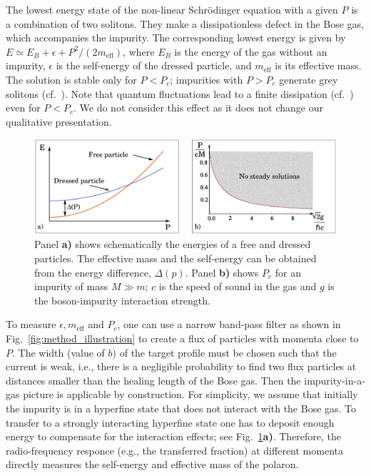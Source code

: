 \documentclass[twocolumn,amsmath,amssymb,showpacs,pra,superscriptaddress,aps]{revtex4-1}
\begin{document}
The lowest energy state of the non-linear Schr{\"o}dinger equation with a given $P$ is a combination of two solitons. They make a dissipationless defect in the Bose gas, which accompanies the impurity. The corresponding lowest energy is given by $E\simeq E_B+\epsilon+P^2/(2m_{\mathrm{eff}})$, where $E_B$ is the energy of the gas without an impurity, $\epsilon$ is the self-energy of the dressed particle, and $m_{\mathrm{eff}}$ is its effective mass. The solution is stable only for $P<P_c$; impurities with $P>P_c$ generate grey solitons (cf.~\cite{hakim1997}). Note that quantum fluctuations lead to a finite dissipation (cf.~\cite{astrakharchik2004,sykes2009,Cherny2012}) even for $P<P_c$. We do not consider this effect as it does not change our qualitative presentation.


\begin{figure}
\centerline{\includegraphics[scale=0.3]{figure3.pdf}}
\caption{Panel {\bf a)} shows schematically the energies of a free and dressed particles. 
The effective mass and the self-energy 
can be obtained from the energy difference, $\Delta(p)$.
Panel {\bf b)} shows $P_c$ for an impurity of mass $M\gg m$; 
$c$ is the speed of sound in the gas and $g$ is the boson-impurity interaction strength.
  }
\label{fig:Figure3}
\end{figure}



To measure $\epsilon, m_{\mathrm{eff}}$ and $P_c$, one can use a narrow band-pass filter as shown in Fig.~\ref{fig:method_illustration} to create a flux of particles with momenta close to $P$. 
The width (value of $b$) of the target profile must be chosen such that the current is weak, i.e., there is a negligible probability to find two flux particles at distances smaller than the healing 
length of the Bose gas. Then the impurity-in-a-gas picture is applicable by construction. 
For simplicity, we assume that initially the impurity is in a hyperfine state 
that does not interact with the Bose gas. To transfer to a strongly interacting hyperfine state 
one has to deposit enough energy to compensate for the interaction effects; see Fig.~\ref{fig:Figure3}{\bf a)}. 
Therefore, the radio-frequency responce (e.g., the transferred fraction) at different momenta directly measures 
the self-energy and effective mass of the polaron.
\end{document}

